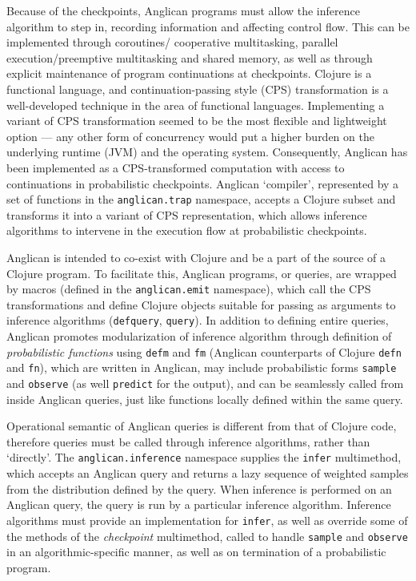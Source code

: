 \documentclass[a4paper]{article}
\begin{document}
Because of the checkpoints, Anglican programs must allow the
inference algorithm to step in, recording information and
affecting control flow. This can be implemented through coroutines/
cooperative multitasking, parallel execution/preemptive
multitasking and shared memory, as well as through explicit
maintenance of program continuations at checkpoints. Clojure is
a functional language, and continuation-passing style (CPS)
transformation is a well-developed technique in the area of
functional languages. Implementing a variant of CPS
transformation seemed to be the most flexible and lightweight
option --- any other form of concurrency would put a higher burden
on the underlying runtime (JVM) and the operating system.
Consequently, Anglican has been implemented as a CPS-transformed
computation with access to continuations in probabilistic
checkpoints. Anglican `compiler', represented by a set of
functions in the \texttt{anglican.trap} namespace, accepts a
Clojure subset and transforms it into a variant of CPS
representation, which allows inference algorithms to intervene
in the execution flow at probabilistic checkpoints.

Anglican is intended to co-exist with Clojure and be a part of
the source of a Clojure program. To facilitate this, Anglican
programs, or queries, are wrapped by macros (defined in the
\texttt{anglican.emit} namespace), which call the CPS
transformations and define Clojure objects suitable for passing
as arguments to inference algorithms (\texttt{defquery},
\texttt{query}). In addition to defining entire queries,
Anglican promotes modularization of inference algorithm through
definition of \textit{probabilistic functions} using
\texttt{defm} and \texttt{fm} (Anglican counterparts of Clojure
\texttt{defn} and \texttt{fn}), which are written in Anglican,
may include probabilistic forms \texttt{sample} and
\texttt{observe} (as well \texttt{predict} for the output), and
can be seamlessly called from inside Anglican queries, just like
functions locally defined within the same query.

Operational semantic of Anglican queries is different from that
of Clojure code, therefore queries must be called through
inference algorithms, rather than `directly'.  The
\texttt{anglican.inference} namespace supplies the
\texttt{infer} multimethod, which accepts an Anglican query and
returns a lazy sequence of weighted samples from the
distribution defined by the query.  When inference
is performed on an Anglican query, the query is run by a
particular inference algorithm. Inference algorithms must
provide an implementation for \texttt{infer}, as well as
override some of the methods of the \textit{checkpoint}
multimethod, called to handle \texttt{sample} and
\texttt{observe} in an algorithmic-specific manner, as well
as on termination of a probabilistic program.
\end{document}
